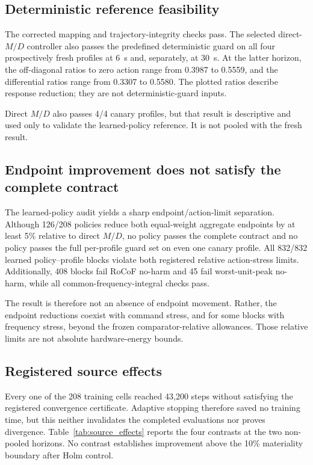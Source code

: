 \documentclass[conference,a4paper]{IEEEtran}
\begin{document}
\subsection{Deterministic reference feasibility}

The corrected mapping and trajectory-integrity checks pass. The selected
direct-$M/D$ controller also passes the predefined deterministic guard on all
four prospectively fresh profiles at \SI{6}{s} and, separately, at
\SI{30}{s}. At the latter horizon, the off-diagonal ratios to zero
action range from 0.3987 to 0.5559, and the differential ratios range from
0.3307 to 0.5580. The plotted ratios describe response reduction; they are not
deterministic-guard inputs.

Direct $M/D$ also passes 4/4 canary profiles, but that result is descriptive
and used only to validate the learned-policy reference. It is not pooled with
the fresh result.

\subsection{Endpoint improvement does not satisfy the complete contract}

The learned-policy audit yields a sharp endpoint/action-limit separation.
Although 126/208 policies reduce both equal-weight aggregate endpoints by at
least 5\% relative to direct $M/D$, no policy passes the complete contract and
no policy passes the full per-profile guard set on even one canary profile.
All 832/832 learned
policy--profile blocks violate both registered relative action-stress limits.
Additionally, 408 blocks fail RoCoF no-harm and 45 fail worst-unit-peak
no-harm, while all common-frequency-integral checks pass.

The result is therefore not an absence of endpoint movement. Rather, the
endpoint reductions coexist with command stress, and for some blocks with
frequency stress, beyond the frozen comparator-relative allowances. Those
relative limits are not absolute hardware-energy bounds.

\subsection{Registered source effects}

Every one of the 208 training cells reached 43,200 steps without satisfying
the registered convergence certificate. Adaptive stopping therefore saved no
training time, but this neither invalidates the completed evaluations nor
proves divergence. Table~\ref{tab:source_effects} reports the four contrasts at
the two non-pooled horizons. No contrast establishes improvement above the
10\% materiality boundary after Holm control.
\end{document}
